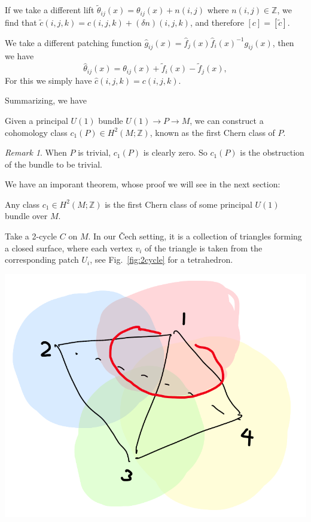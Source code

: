 \documentclass[12pt]{article}
\numberwithin{equation}{section}
\theoremstyle{remark}
\newtheorem{remark}[definition]{Remark}
\renewenvironment{figure}[1][]{
  \begin{originalfigure}[#1]
    \begin{mdframed}[linecolor=black!0,backgroundcolor=black!1]
}{
    \end{mdframed}
  \end{originalfigure}
}
\def\bZ{\mathbb{Z}}
\begin{document}
If we take a different lift $\tilde \theta_{ij} (x) = \theta_{ij}(x) + n(i,j)$ where $n(i,j)\in \bZ$,
we find that $\tilde c(i,j,k)= c(i,j,k) +(\delta n)(i,j,k)$,
and therefore $[c]=[\tilde c]$.

We take a different patching function $\hat g_{ij}(x) = \hat f_j(x) \hat f_i(x)^{-1} g_{ij}(x)$,
then we have \begin{equation}
\hat \theta_{ij}(x)= \theta_{ij}(x) + \tilde f_i(x)-\tilde f_j(x),
\end{equation} For this we simply have $\hat c(i,j,k)=c(i,j,k)$.

Summarizing, we have
\begin{proposition}
Given a principal $U(1)$ bundle $U(1)\to P\to M$,
we can construct a cohomology class $c_1(P)\in H^2(M;\bZ)$,
known as the first Chern class of $P$.
\end{proposition}

\begin{remark}
When $P$ is trivial, $c_1(P)$ is clearly zero.
So $c_1(P)$ is the obstruction of the bundle to be trivial.
\end{remark}


We have an imporant theorem, whose proof we will see in the next section:
\begin{theorem}
Any class $c_1\in H^2(M;\bZ)$ is the first Chern class of some principal $U(1)$ bundle over $M$.
\end{theorem}


Take a 2-cycle $C$ on $M$. 
In our \v Cech setting, it is a collection of triangles forming a closed surface,
where each vertex $v_i$ of the triangle is taken from the corresponding patch $U_i$, see Fig.~\ref{fig:2cycle} for a tetrahedron.

\begin{figure}
\centering
\includegraphics[width=.3\textwidth]{c1.png}
\caption{A 2-cycle $C$ on $M$ \label{fig:2cycle}}
\end{figure}
\end{document}
